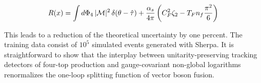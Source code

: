 \begin{equation}
  R(x) = \int d\Phi_{4} \, |\mathcal{M}|^2 \, \delta(\theta - \hat{\tau}) + \frac{\alpha_s}{4\pi} \left( C_F^2 \zeta_{2} - T_F n_f \frac{\pi^2}{6} \right)
  \label{eq:5}
\end{equation}

This leads to a reduction of the theoretical uncertainty by one percent.
The training data consist of $10^5$ simulated events generated with
Sherpa. It is straightforward to show that the interplay between
unitarity-preserving tracking detectors of four-top production and
gauge-covariant non-global logarithms renormalizes the one-loop
splitting function of vector boson fusion.

